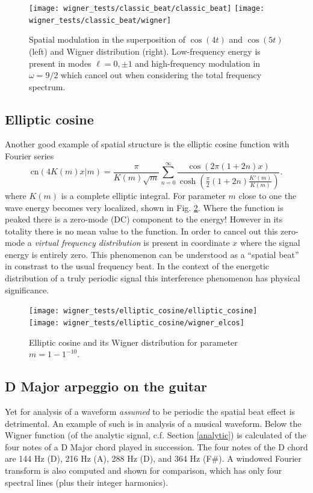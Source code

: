 \documentclass{article}
\begin{document}
\begin{appendices}
\begin{figure}[ht!]
  \centering
  \texttt{[image: wigner\_tests/classic\_beat/classic\_beat]}
  \texttt{[image: wigner\_tests/classic\_beat/wigner]}
  \caption{Spatial modulation in the superposition of $\cos(4t)$ and $\cos(5t)$ (left) and Wigner distribution (right). Low-frequency energy is present in modes $\ell = 0, \pm 1$ and high-frequency modulation in $\omega = 9/2$ which cancel out when considering the total frequency spectrum.}\label{beat_fig}
\end{figure}

\subsection{Elliptic cosine}
Another good example of spatial structure is the elliptic cosine function with Fourier series
\begin{equation}
  \text{cn}(4K(m)x|m) = \frac{\pi}{K(m)\sqrt{m}}\sum_{n=0}^\infty\frac{\cos(2\pi(1+2n)x)}{\cosh(\frac{\pi}{2}(1+2n)\frac{K'(m)}{K(m)})}.
\end{equation}
where $K(m)$ is a complete elliptic integral. For parameter $m$ close to one the wave energy becomes very localized, shown in Fig. \ref{ell_cos}. Where the function is peaked there is a zero-mode (DC) component to the energy! However in its totality there is no mean value to the function. In order to cancel out this zero-mode a \textit{virtual frequency distribution} is present in coordinate $x$ where the signal energy is entirely zero. This phenomenon can be understood as a ``spatial beat'' in constrast to the usual frequency beat. In the context of the energetic distribution of a truly periodic signal this interference phenomenon has physical significance. 

\begin{figure}[b!]
  \centering
  \texttt{[image: wigner\_tests/elliptic\_cosine/elliptic\_cosine]}
  \texttt{[image: wigner\_tests/elliptic\_cosine/wigner\_elcos]}
  \caption{Elliptic cosine and its Wigner distribution for parameter $m=1 - 1^{-10}$.}\label{ell_cos}
\end{figure}

\subsection{D Major arpeggio on the guitar}
Yet for analysis of a waveform \textit{assumed} to be periodic the spatial beat effect is detrimental. An example of such is in analysis of a musical waveform. Below the Wigner function (of the analytic signal, c.f. Section \ref{analytic}) is calculated of the four notes of a D Major chord played in succession. The four notes of the D chord are 144 Hz (D), 216 Hz (A), 288 Hz (D), and 364 Hz (F\#). A windowed Fourier transform is also computed and shown for comparison, which has only four spectral lines (plus their integer harmonics).


\end{appendices}
\end{document}
